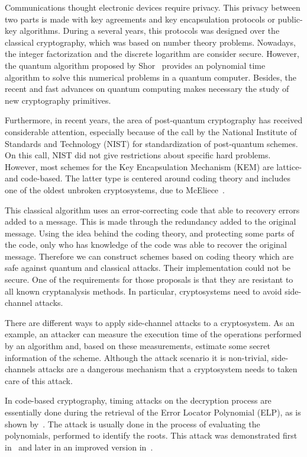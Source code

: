 Communications thought electronic devices require privacy. This privacy between two parts is made with key agreements and key encapsulation protocols or public-key algorithms. During a several years, this protocols was designed over the classical cryptography, which was based on number theory problems. Nowadays, the integer factorization and the discrete logarithm are consider secure. However, the quantum algorithm proposed by Shor~\cite{shor1999polynomial} provides an polynomial time algorithm to solve this numerical problems in a quantum computer. Besides, the recent and fast advances on quantum computing makes necessary the study of new cryptography primitives. 

Furthermore, in recent years, the area of post-quantum cryptography has received considerable attention, especially because of the call by the National Institute of Standards and Technology (NIST) for  standardization of post-quantum schemes. On this call, NIST did not give restrictions about specific hard problems. However, most schemes for the Key Encapsulation Mechanism (KEM) are lattice- and code-based. The latter type is centered around coding theory and includes one of the oldest unbroken cryptosystems, due to McEliece~\cite{mceliece1978public}.

This classical algorithm uses an error-correcting code that able to recovery errors added to a message. This is made through the redundancy added to the original message. Using the idea behind the coding theory, and protecting some parts of the code, only who has knowledge of the code was able to recover the original message. Therefore we can construct schemes based on coding theory which are safe against quantum and classical attacks. Their implementation could not be secure. One of the requirements for those proposals is that they are resistant to all known cryptanalysis methods. In particular, cryptosystems need to avoid side-channel attacks.

There are different ways to apply side-channel attacks to a cryptosystem. As an example, an attacker can measure the execution time of the operations performed by an algorithm and, based on these measurements, estimate some secret information of the scheme. Although the attack scenario it is non-trivial, side-channels attacks are a dangerous mechanism that a cryptosystem needs to taken care of this attack.
 
In code-based cryptography, timing attacks on the decryption process are essentially done during the retrieval of the Error Locator Polynomial (ELP), as is shown by~\cite{shoufan2009timing}. The attack is usually done in the process of evaluating the polynomials, performed to identify the roots. This attack was demonstrated first in~\cite{shoufan2009timing} and later in an improved version in~\cite{bucerzan2017improved}.

